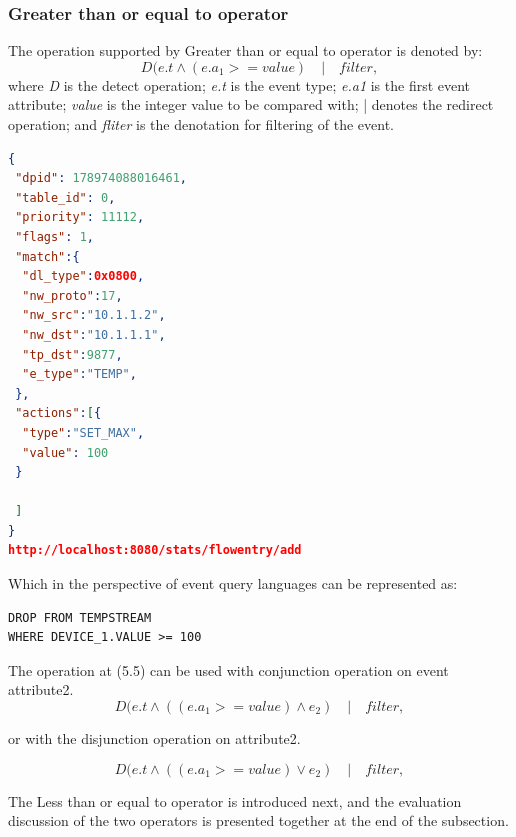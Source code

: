 \subsubsection{Greater than or equal to operator}
The operation supported by Greater than or equal to operator is denoted by:
\begin{equation}D(e.t  \wedge (e.a_1 >= value) \quad | \quad filter, \end{equation}
where \textit{D} is the detect operation; \newline
\textit{e.t} is the event type; \newline
\textit{e.a1} is the first event attribute; \newline
\textit{value} is the integer value to be compared with; \newline
| denotes the redirect operation; \newline
and \textit{fliter} is the denotation for filtering of the event. \newline \newline
\begin{lstlisting}[language=json,firstnumber=1]
{
 "dpid": 178974088016461,
 "table_id": 0,
 "priority": 11112,
 "flags": 1,
 "match":{
  "dl_type":0x0800,
  "nw_proto":17,
  "nw_src":"10.1.1.2",
  "nw_dst":"10.1.1.1",
  "tp_dst":9877,
  "e_type":"TEMP",
 },
 "actions":[{
  "type":"SET_MAX",
  "value": 100
 }

 ]
}
http://localhost:8080/stats/flowentry/add \end{lstlisting}

Which in the perspective of event query languages can be represented as:

\begin{verbatim}
DROP FROM TEMPSTREAM
WHERE DEVICE_1.VALUE >= 100
\end{verbatim}

The operation at (5.5) can be used with conjunction operation on event attribute2.
\begin{equation}D(e.t  \wedge ((e.a_1 >= value) \wedge e_2 )\quad | \quad filter, \end{equation}

or with the disjunction operation on attribute2.

\begin{equation}D(e.t  \wedge ((e.a_1 >= value) \vee e_2 )\quad | \quad filter, \end{equation}

 The Less than or equal to operator is introduced next, and the evaluation discussion of the two operators is presented together at the end of the subsection.

